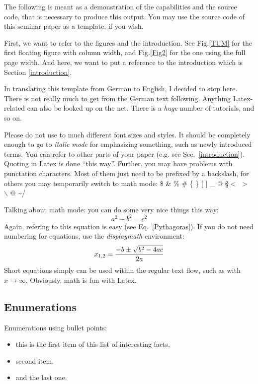 \documentclass[twocolumn]{article}
\begin{document}
The following is meant as a demonstration of the capabilities and
the source code, that is necessary to produce this output. You may
use the source code of this seminar paper as a template, if you wish.


First, we want to refer to the figures and the introduction.
See Fig.\ref{TUM} for the first floating figure with column width,
and Fig.\ref{Fig2} for the one using the full page width.
And here, we want to put a reference to the introduction which is
Section \ref{introduction}.

In translating this template from German to English, I decided to
stop here. There is not really much to get from the German text
following. Anything Latex-related can also be looked up on the
net. There is a {\it huge} number of tutorials, and so on.

Please do not use to much different font sizes and styles. It should
be completely enough to go to {\em italic mode} for emphasizing something,
such as newly introduced terms.
You can refer to other parts of your paper (e.g. see Sec.~\ref{introduction}).
Quoting in Latex is done ``this way''.
Further, you may have problems with punctation characters.
Most of them just need to be prefixed by a backslash, for others you may
temporarily switch to math mode:
\$ \& \% \# \{ \} [ ] \_ @ \S $<$ $>$ $\backslash$ @ \textasciitilde /

Talking about math mode: you can do some very nice things this way:
\begin{equation}
a^2 + b^2 = c^2
\label{Pythagoras}
\end{equation}
Again, refering to this equation is easy (see Eq.~\ref{Pythagoras}).
If you do not need numbering for equations, use the {\em displaymath}
environment:
\begin{displaymath}
x_{1,2} = \frac{-b \pm \sqrt{b^2-4ac}}{2a}\\
\end{displaymath}
Short equations simply can be used within the regular text flow, such
as with $x \to \infty$. Obviously, math is fun with Latex.


\subsection*{Enumerations}

Enumerations using bullet points:

\begin{itemize}
	\item this is the first item of this list of interesting facts,
	\item second item,
	\item and the last one.
\end{itemize}
\end{document}
